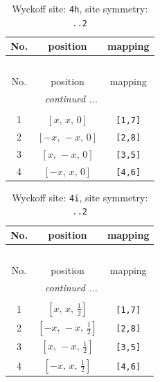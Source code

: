 \documentclass[fleqn,8pt]{jsarticle}
\begin{document}
\begin{longtable}{ccc}
\caption{Wyckoff site: {\tt 4h}, site symmetry: {\tt ..2}}
 \\
 \hline \hline
No. & position & mapping \\ \hline \endfirsthead

\multicolumn{2}{l}{\tablename\ \thetable{}} \\
 \hline \hline
No. & position & mapping \\ \hline \endhead

 \hline \hline
\multicolumn{2}{r}{\footnotesize\it continued ...} \\ \endfoot

 \hline \hline
\multicolumn{2}{r}{} \\ \endlastfoot

1 & $\left[ x,\, x,\, 0 \right]$ & {\tt [1,7]} \\ \hline
2 & $\left[ - x,\, - x,\, 0 \right]$ & {\tt [2,8]} \\ \hline
3 & $\left[ x,\, - x,\, 0 \right]$ & {\tt [3,5]} \\ \hline
4 & $\left[ - x,\, x,\, 0 \right]$ & {\tt [4,6]} \\
\end{longtable}
\renewcommand{\arraystretch}{1.2}
\begin{longtable}{ccc}
\caption{Wyckoff site: {\tt 4i}, site symmetry: {\tt ..2}}
 \\
 \hline \hline
No. & position & mapping \\ \hline \endfirsthead

\multicolumn{2}{l}{\tablename\ \thetable{}} \\
 \hline \hline
No. & position & mapping \\ \hline \endhead

 \hline \hline
\multicolumn{2}{r}{\footnotesize\it continued ...} \\ \endfoot

 \hline \hline
\multicolumn{2}{r}{} \\ \endlastfoot

1 & $\left[ x,\, x,\, \frac{1}{2} \right]$ & {\tt [1,7]} \\ \hline
2 & $\left[ - x,\, - x,\, \frac{1}{2} \right]$ & {\tt [2,8]} \\ \hline
3 & $\left[ x,\, - x,\, \frac{1}{2} \right]$ & {\tt [3,5]} \\ \hline
4 & $\left[ - x,\, x,\, \frac{1}{2} \right]$ & {\tt [4,6]} \\
\end{longtable}
\end{document}
